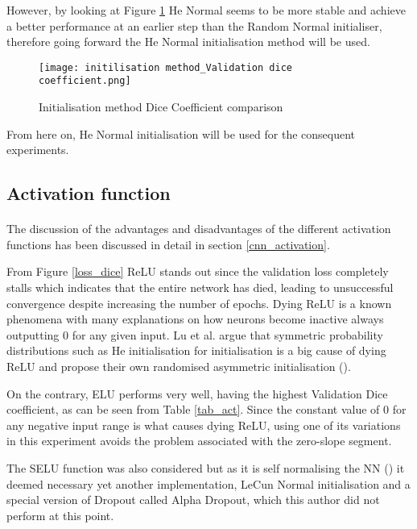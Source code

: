 However, by looking at Figure \ref{init_dice} He Normal seems to be more stable and achieve a better performance at an earlier step than the Random Normal initialiser, therefore going forward the He Normal initialisation method will be used.

\begin{figure}[hbt!]
    \centering
    \texttt{[image: initilisation method\_Validation dice coefficient.png]}
    \caption{Initialisation method Dice Coefficient comparison}
    \label{init_dice}
\end{figure}    

From here on, He Normal initialisation will be used for the consequent experiments.

\subsection{Activation function}
\paragraph{}
The discussion of the advantages and disadvantages of the different activation functions has been discussed in detail in section \ref{cnn_activation}.

From Figure \ref{loss_dice} \gls{ReLU} stands out since the validation loss completely stalls which indicates that the entire network has died, leading to unsuccessful convergence despite increasing the number of epochs. Dying \gls{ReLU} is a known phenomena with many explanations on how neurons become inactive always outputting $0$ for any given input. Lu et al. argue that symmetric probability distributions such as He initialisation for initialisation is a big cause of dying \gls{ReLU} and propose their own randomised asymmetric initialisation (\cite{Lu_2020}).

On the contrary, \gls{ELU} performs very well, having the highest Validation Dice coefficient, as can be seen from Table \ref{tab_act}. Since the constant value of $0$ for any negative input range is what causes dying \gls{ReLU}, using one of its variations in this experiment avoids the problem associated with the zero-slope segment.

The \gls{SELU} function was also considered but as it is self normalising the \gls{NN} (\cite{klambauer2017selfnormalizing}) it deemed necessary yet another implementation, LeCun Normal initialisation and a special version of Dropout called Alpha Dropout, which this author did not perform at this point.

